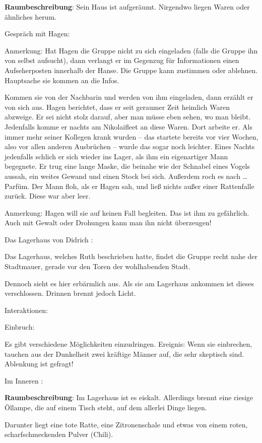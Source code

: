 \textbf{Raumbeschreibung}: Sein Haus ist aufgeräumt. Nirgendwo liegen Waren oder ähnliches herum.

Gespräch mit Hagen:

Anmerkung: Hat Hagen die Gruppe nicht zu sich eingeladen (falls die Gruppe ihn von selbst aufsucht), dann verlangt er im Gegenzug für Informationen einen Aufseherposten innerhalb der Hanse. Die Gruppe kann zustimmen oder ablehnen. Hauptsache sie kommen an die Infos.

Kommen sie von der Nachbarin und werden von ihm eingeladen, dann erzählt er von sich aus.
Hagen berichtet, dass er seit geraumer Zeit heimlich Waren abzweige. Er sei nicht stolz darauf, aber man müsse eben sehen, wo man bleibt. Jedenfalls komme er nachts am Nikolaifleet an diese Waren. Dort arbeite er. Als immer mehr seiner Kollegen krank wurden – das startete bereits vor vier Wochen, also vor allen anderen Ausbrüchen – wurde das sogar noch leichter. Eines Nachts jedenfalls schlich er sich wieder ins Lager, als ihm ein eigenartiger Mann begegnete. Er trug eine lange Maske, die beinahe wie der Schnabel eines Vogels aussah, ein weites Gewand und einen Stock bei sich. Außerdem roch es nach … Parfüm. Der Mann floh, als er Hagen sah, und ließ nichts außer einer Rattenfalle zurück. Diese war aber leer.

Anmerkung: Hagen will sie auf keinen Fall begleiten. Das ist ihm zu gefährlich. Auch mit Gewalt oder Drohungen kann man ihn nicht überzeugen!

Das Lagerhaus von Didrich
:

Das Lagerhaus, welches Ruth beschrieben hatte, findet die Gruppe recht nahe der Stadtmauer, gerade vor den Toren der wohlhabenden Stadt.

Dennoch sieht es hier erbärmlich aus. Als sie am Lagerhaus ankommen ist dieses verschlossen. Drinnen brennt jedoch Licht.

Interaktionen:

Einbruch:

Es gibt verschiedene Möglichkeiten einzudringen.
Ereignis: Wenn sie einbrechen, tauchen aus der Dunkelheit zwei kräftige Männer auf, die sehr skeptisch sind. Ablenkung ist gefragt!


Im Inneren
:

\textbf{Raumbeschreibung}: Im Lagerhaus ist es eiskalt. Allerdings brennt eine riesige Öllampe, die auf einem Tisch steht, auf dem allerlei Dinge liegen.

Darunter liegt eine tote Ratte, eine Zitronenschale und etwas von einem roten, scharfschmeckenden Pulver (Chili).

